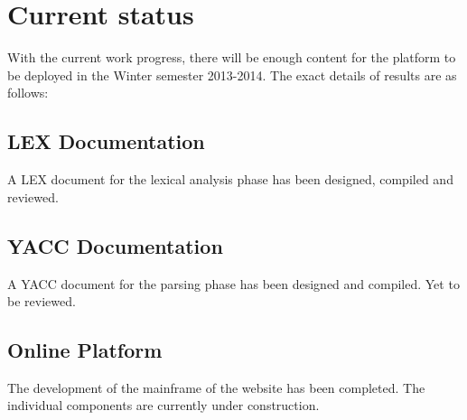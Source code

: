 \chapter{Current status}
With the current work progress, there will be enough content for the platform to be deployed in the Winter semester 2013-2014. The exact details of results are as follows: 
\section{LEX Documentation}
A LEX document for the lexical analysis phase has been designed, compiled and reviewed. 
\section{YACC Documentation}
A YACC document for the parsing phase has been designed and compiled. Yet to be reviewed. 
\section{Online Platform}
The development of the mainframe of the website has been completed. The individual components are currently under construction. 


